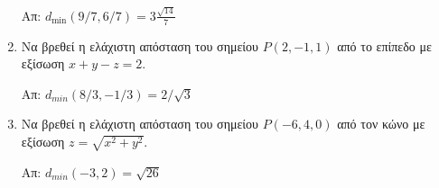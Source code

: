 \begin{enumerate}
    \hfill Απ: $ d_{\min}(9/7,6/7) = 3\frac{\sqrt{14}}{7} $  

  \item Να βρεθεί η ελάχιστη απόσταση του σημείου $ P(2,-1,1) $ από το επίπεδο με 
    εξίσωση $ x+y-z=2 $. 

    \hfill Απ: $ d_{min}(8/3,-1/3) = 2 /\sqrt{3} $ 

  \item Να βρεθεί η ελάχιστη απόσταση του σημείου $ P(-6,4,0) $ από τον κώνο με 
    εξίσωση $ z = \sqrt{x^{2}+y^{2}} $. 

    \hfill Απ: $ d_{min}(-3,2) = \sqrt{26} $ 

\end{enumerate}


